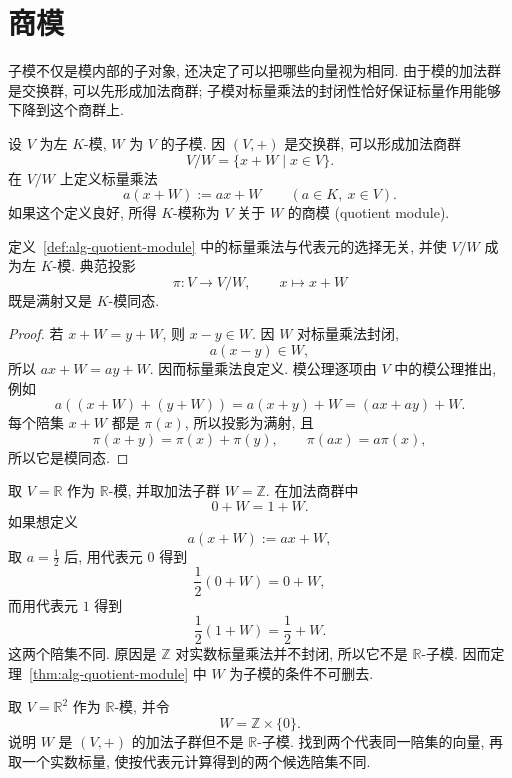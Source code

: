 \documentclass[usesamecnt, thmcnt=section, lang=cn, newtx, 10pt, scheme=chinese]{elegantbook}
\begin{document}
\section{商模}

子模不仅是模内部的子对象, 还决定了可以把哪些向量视为相同. 由于模的加法群是交换群, 可以先形成加法商群; 子模对标量乘法的封闭性恰好保证标量作用能够下降到这个商群上.

\begin{definition}[商模]\label{def:alg-quotient-module}
设 $V$ 为左 $K$-模, $W$ 为 $V$ 的子模. 因 $(V,+)$ 是交换群, 可以形成加法商群
\[
 V/W=\{x+W\mid x\in V\}.
\]
在 $V/W$ 上定义标量乘法
\[
 a(x+W):=ax+W
 \qquad(a\in K,\ x\in V).
\]
如果这个定义良好, 所得 $K$-模称为 $V$ 关于 $W$ 的{\color{blue}商模 (quotient module)}.
\end{definition}

\begin{theorem}\label{thm:alg-quotient-module}
定义~\ref{def:alg-quotient-module} 中的标量乘法与代表元的选择无关, 并使 $V/W$ 成为左 $K$-模. 典范投影
\[
 \pi:V\longrightarrow V/W,
 \qquad x\longmapsto x+W
\]
既是满射又是 $K$-模同态.
\end{theorem}

\begin{proof}
若 $x+W=y+W$, 则 $x-y\in W$. 因 $W$ 对标量乘法封闭,
\[
 a(x-y)\in W,
\]
所以 $ax+W=ay+W$. 因而标量乘法良定义. 模公理逐项由 $V$ 中的模公理推出, 例如
\[
 a((x+W)+(y+W))=a(x+y)+W=(ax+ay)+W.
\]
每个陪集 $x+W$ 都是 $\pi(x)$, 所以投影为满射, 且
\[
 \pi(x+y)=\pi(x)+\pi(y),
 \qquad
 \pi(ax)=a\pi(x),
\]
所以它是模同态.
\end{proof}

\begin{instance}
取 $V=\mathbb R$ 作为 $\mathbb R$-模, 并取加法子群 $W=\mathbb Z$. 在加法商群中
\[
 0+W=1+W.
\]
如果想定义
\[
 a(x+W):=ax+W,
\]
取 $a=\frac12$ 后, 用代表元 $0$ 得到
\[
 \frac12(0+W)=0+W,
\]
而用代表元 $1$ 得到
\[
 \frac12(1+W)=\frac12+W.
\]
这两个陪集不同. 原因是 $\mathbb Z$ 对实数标量乘法并不封闭, 所以它不是 $\mathbb R$-子模. 因而定理~\ref{thm:alg-quotient-module} 中 $W$ 为子模的条件不可删去.
\end{instance}

\begin{exercise}\label{ex:alg-quotient-module-subgroup}
取 $V=\mathbb R^2$ 作为 $\mathbb R$-模, 并令
\[
 W=\mathbb Z\times\{0\}.
\]
说明 $W$ 是 $(V,+)$ 的加法子群但不是 $\mathbb R$-子模. 找到两个代表同一陪集的向量, 再取一个实数标量, 使按代表元计算得到的两个候选陪集不同.
\end{exercise}
\end{document}
